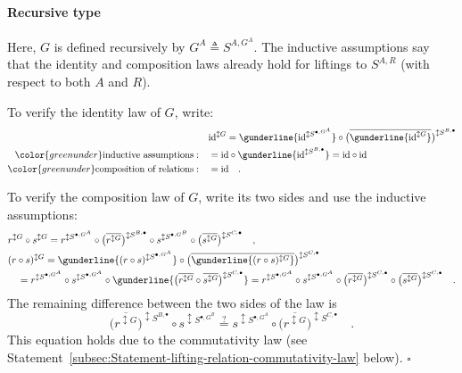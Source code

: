 \paragraph{Recursive type}

Here, $G$ is defined recursively by $G^{A}\triangleq S^{A,G^{A}}$.
The inductive assumptions say that the identity and composition laws
already hold for liftings to $S^{A,R}$ (with respect to both $A$
and $R$).

To verify the identity law of $G$, write:
\begin{align*}
 & \text{id}^{\updownarrow G}=\gunderline{\text{id}^{\updownarrow S^{\bullet,G^{A}}}}\circ\big(\overline{\gunderline{\text{id}^{\updownarrow G}}}\big)^{\updownarrow S^{B,\bullet}}\\
{\color{greenunder}\text{inductive assumptions}:}\quad & =\text{id}\circ\gunderline{\text{id}^{\updownarrow S^{B,\bullet}}}=\text{id}\circ\text{id}\\
{\color{greenunder}\text{composition of relations}:}\quad & =\text{id}\quad.
\end{align*}

To verify the composition law of $G$, write its two sides and use
the inductive assumptions:
\begin{align*}
 & r^{\updownarrow G}\circ s^{\updownarrow G}=r^{\updownarrow S^{\bullet,G^{A}}}\circ\big(\overline{r^{\updownarrow G}}\big)^{\updownarrow S^{B,\bullet}}\circ s^{\updownarrow S^{\bullet,G^{B}}}\circ\big(\overline{s^{\updownarrow G}}\big)^{\updownarrow S^{C,\bullet}}\quad,\\
 & (r\circ s)^{\updownarrow G}=\gunderline{(r\circ s)^{\updownarrow S^{\bullet,G^{A}}}}\circ\big(\overline{\gunderline{(r\circ s)^{\updownarrow G}}}\big)^{\updownarrow S^{C,\bullet}}\\
 & \quad=r^{\updownarrow S^{\bullet,G^{A}}}\circ s^{\updownarrow S^{\bullet,G^{A}}}\circ\gunderline{\big(\overline{r^{\updownarrow G}}\circ\overline{s^{\updownarrow G}}\big)^{\updownarrow S^{C,\bullet}}}=r^{\updownarrow S^{\bullet,G^{A}}}\circ s^{\updownarrow S^{\bullet,G^{A}}}\circ\big(\overline{r^{\updownarrow G}}\big)^{\updownarrow S^{C,\bullet}}\circ\big(\overline{s^{\updownarrow G}}\big)^{\updownarrow S^{C,\bullet}}\quad.
\end{align*}
The remaining difference between the two sides of the law is
\[
\big(\overline{r^{\updownarrow G}}\big)^{\updownarrow S^{B,\bullet}}\circ s^{\updownarrow S^{\bullet,G^{B}}}\overset{?}{=}s^{\updownarrow S^{\bullet,G^{A}}}\circ\big(\overline{r^{\updownarrow G}}\big)^{\updownarrow S^{C,\bullet}}\quad.
\]
This equation holds due to the commutativity law (see Statement~\ref{subsec:Statement-lifting-relation-commutativity-law}
below). $\square$

